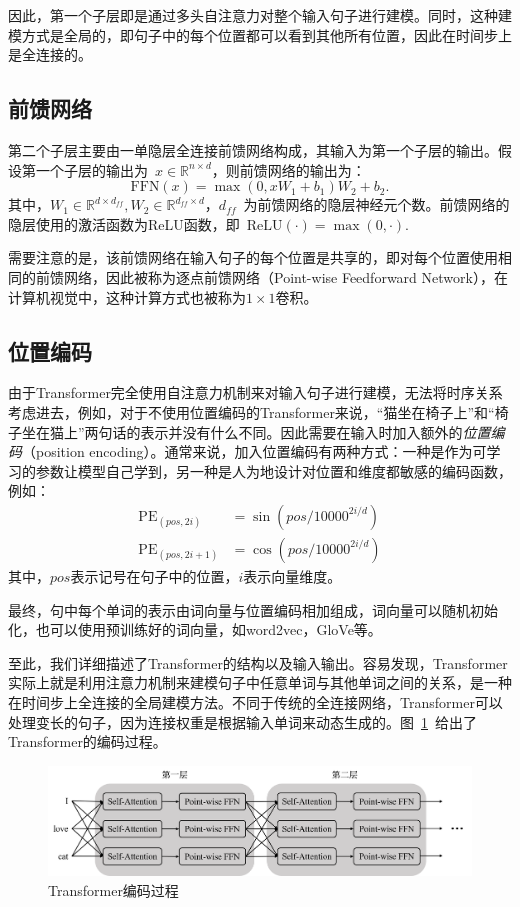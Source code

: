 因此，第一个子层即是通过多头自注意力对整个输入句子进行建模。同时，这种建模方式是全局的，即句子中的每个位置都可以看到其他所有位置，因此在时间步上是全连接的。

\subsection{前馈网络}
第二个子层主要由一单隐层全连接前馈网络构成，其输入为第一个子层的输出。假设第一个子层的输出为~$x\in \mathbb{R}^{n\times d}$，则前馈网络的输出为：
\begin{equation}
	\mathrm{FFN}(x) = \max(0, xW_1+b_1)W_2+b_2.
\end{equation}
其中，$W_1 \in \mathbb{R}^{d\times d_{ff}}, W_2 \in \mathbb{R}^{d_{ff} \times d}$，$d_{ff}$~为前馈网络的隐层神经元个数。前馈网络的隐层使用的激活函数为ReLU函数，即~$\mathrm{ReLU}(\cdot)=\max(0, \cdot)$.

需要注意的是，该前馈网络在输入句子的每个位置是共享的，即对每个位置使用相同的前馈网络，因此被称为逐点前馈网络（Point-wise Feedforward Network），在计算机视觉中，这种计算方式也被称为$1\times 1$卷积。
\subsection{位置编码}
由于Transformer完全使用自注意力机制来对输入句子进行建模，无法将时序关系考虑进去，例如，对于不使用位置编码的Transformer来说，“猫坐在椅子上”和“椅子坐在猫上”两句话的表示并没有什么不同。因此需要在输入时加入额外的\emph{位置编码}（position encoding）。通常来说，加入位置编码有两种方式：一种是作为可学习的参数让模型自己学到，另一种是人为地设计对位置和维度都敏感的编码函数，例如：
\begin{equation}
	\begin{aligned}
	\mathrm{PE}_{(pos, 2i)} &= \sin(pos/10000^{2i/d})\\
	\mathrm{PE}_{(pos, 2i+1)} &= \cos(pos/10000^{2i/d})
	\end{aligned}
\end{equation}
其中，$pos$表示记号在句子中的位置，$i$表示向量维度。

最终，句中每个单词的表示由词向量与位置编码相加组成，词向量可以随机初始化，也可以使用预训练好的词向量，如word2vec，GloVe等。

至此，我们详细描述了Transformer的结构以及输入输出。容易发现，Transformer实际上就是利用注意力机制来建模句子中任意单词与其他单词之间的关系，是一种在时间步上全连接的全局建模方法。不同于传统的全连接网络，Transformer可以处理变长的句子，因为连接权重是根据输入单词来动态生成的。图~\ref{fig:tf_s}~给出了Transformer的编码过程。
\begin{figure}[htb]
	\centering
	\includegraphics[scale=0.46]{tf_s.png}
	\caption{Transformer编码过程}
	\label{fig:tf_s}
\end{figure}

